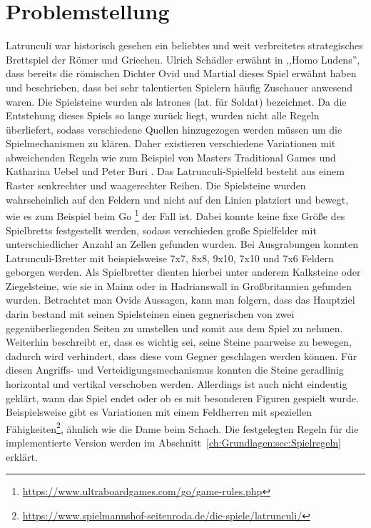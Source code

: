 \section{Problemstellung}
\label{ch:Einleitung:sec:Problemstellung} 
Latrunculi war historisch gesehen ein beliebtes und weit verbreitetes strategisches Brettspiel der Römer und Griechen. Ulrich Schädler erwähnt in ,,Homo Ludens'', dass bereits die römischen Dichter Ovid und Martial dieses Spiel erwähnt haben und beschrieben, dass bei sehr talentierten Spielern häufig Zuschauer anwesend waren.
Die Spielsteine wurden als latrones (lat. für Soldat) 
bezeichnet. Da die Entstehung dieses Spiels so lange zurück liegt, wurden nicht alle Regeln überliefert, sodass verschiedene Quellen hinzugezogen werden müssen um die Spielmechanismen zu klären. Daher existieren verschiedene Variationen mit abweichenden Regeln wie zum Beispiel von Masters Traditional Games \cite{mastersgames} und Katharina Uebel und Peter Buri \cite{uebel}.
Das Latrunculi-Spielfeld besteht aus einem Raster senkrechter und waagerechter Reihen. Die Spielsteine wurden wahrscheinlich auf den Feldern und nicht auf den Linien platziert und bewegt, wie es zum Beispiel beim Go \footnote{\url{https://www.ultraboardgames.com/go/game-rules.php}} der Fall ist. Dabei konnte keine fixe Größe des Spielbretts festgestellt werden, sodass verschieden große Spielfelder mit unterschiedlicher Anzahl an Zellen gefunden wurden. Bei Ausgrabungen konnten Latrunculi-Bretter mit beispielsweise 7x7, 8x8, 9x10, 7x10 und 7x6 Feldern geborgen werden. Als Spielbretter dienten hierbei unter anderem Kalksteine oder Ziegelsteine, wie sie in Mainz oder in Hadrianswall in Großbritannien gefunden wurden\cite{homoLudens}. Betrachtet man Ovids Aussagen, kann man folgern, dass das Hauptziel darin bestand mit seinen Spielsteinen einen gegnerischen von zwei gegenüberliegenden Seiten zu umstellen und somit aus dem Spiel zu nehmen. Weiterhin beschreibt er, dass es wichtig sei, seine Steine paarweise zu bewegen, dadurch wird verhindert, dass diese vom Gegner geschlagen werden können. Für diesen Angriffs- und Verteidigungsmechanismus konnten die Steine geradlinig horizontal und vertikal verschoben werden. Allerdings ist auch nicht eindeutig geklärt, wann das Spiel endet oder ob es mit besonderen Figuren gespielt wurde. Beispielsweise gibt es Variationen mit einem Feldherren mit speziellen Fähigkeiten\footnote{\url{https://www.spielmannshof-seitenroda.de/die-spiele/latrunculi/}}, ähnlich wie die Dame beim Schach. Die festgelegten Regeln für die implementierte Version werden im Abschnitt~\ref{ch:Grundlagen:sec:Spielregeln} erklärt.

